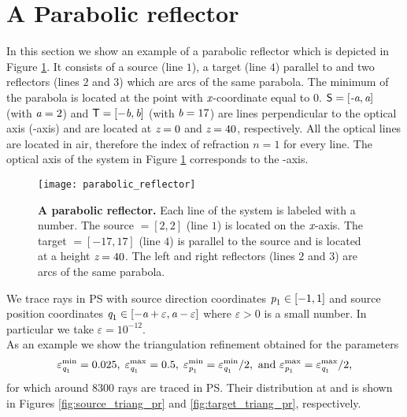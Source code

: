 \section{A Parabolic reflector}
In this section we show an example of a parabolic reflector which is depicted in Figure \ref{fig:PR}.
 It consists of a source  (line $1$), a target  (line $4$) parallel to  and two reflectors (lines $2$ and $3$) which are arcs of the same parabola. 
  The minimum of the parabola is located at the point with $\textit{x}$-coordinate equal to $0$. $\textsf{S}=[\textit{-a}, \textit{a}]$ (with $\textit{a}=2$) and $\textsf{T}=[-\textit{b},\textit{b}]$ (with $\textit{b}=17$) are lines perpendicular to the optical axis (-axis) and are located at $\textit{z}=0$ and $\textit{z}=40$, respectively.
All the optical lines are located in air, therefore the index of refraction ${n}=1$ for every line.
The optical axis of the system in Figure \ref{fig:PR} corresponds to the -axis.
\begin{figure}[h!]
\centering
\texttt{[image: parabolic\_reflector]}
\caption{\textbf{A parabolic reflector.}  Each line of the system is labeled with a number.
   The source $= [2,2]$ (line $1$) is located on the $\textit{x}$-axis.
   The target $= [-17, 17]$ (line $4$) is parallel to the source and is located at a height $ \textit{z}= 40$.
   The left and right reflectors (lines $2$ and $3$) are arcs of the same parabola.}
\label{fig:PR}
\end{figure}
We trace rays in PS with source direction coordinates $\textit{p}_1 \in [-1,1]$ and source position coordinates $\textit{q}_1\in[-\textit{a}+\varepsilon,\textit{a}-\varepsilon]$ where $\varepsilon>0$ is a small number. In particular we take $\varepsilon = 10^{-12}$.\\ \indent As an example we show the triangulation refinement obtained for the parameters $$\varepsilon_{\textit{q}_1}^{\textrm{min}} = 0.025, \; \varepsilon_{\textit{q}_1}^{\textrm{max}} = 0.5, \; \varepsilon_{\textit{p}_1}^{\textrm{min}} = \varepsilon_{\textit{q}_1}^{\textrm{min}}/2, \mbox{ and }  \varepsilon_{\textit{p}_1}^{\textrm{max}} = \varepsilon_{\textit{q}_1}^{\textrm{max}}/2, $$ for which around $8300$ rays are traced in PS. Their distribution at  and  is shown in Figures \ref{fig:source_triang_pr} and \ref{fig:target_triang_pr}, respectively. 
